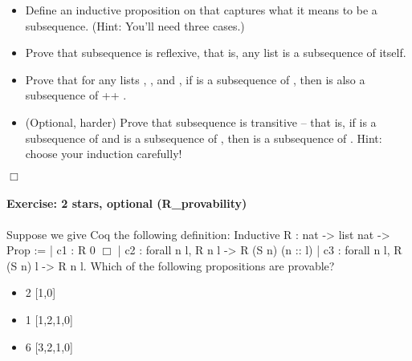 \documentclass[12pt]{report}
\begin{document}
\begin{itemize}
\item  Define an inductive proposition  on   that
      captures what it means to be a subsequence. (Hint: You'll need
      three cases.)



\item  Prove  that subsequence is reflexive, that is, 
      any list is a subsequence of itself.  



\item  Prove  that for any lists , , and , 
      if  is a subsequence of , then  is also a subsequence
      of  ++ .



\item  (Optional, harder) Prove  that subsequence is 
      transitive -- that is, if  is a subsequence of  and  
      is a subsequence of , then  is a subsequence of .  
      Hint: choose your induction carefully!

\end{itemize}
\begin{coqdoccode}
\coqdocemptyline
\end{coqdoccode}
\ensuremath{\Box} 

\paragraph{Exercise: 2 stars, optional (R\_provability)}

 Suppose we give Coq the following definition:
    Inductive R : nat -> list nat -> Prop :=
      | c1 : R 0 \ensuremath{\Box}
      | c2 : forall n l, R n l -> R (S n) (n :: l)
      | c3 : forall n l, R (S n) l -> R n l.
    Which of the following propositions are provable?



\begin{itemize}
\item  {} 2 [1,0]

\item  {} 1 [1,2,1,0]

\item  {} 6 [3,2,1,0]

\end{itemize}
\end{document}
